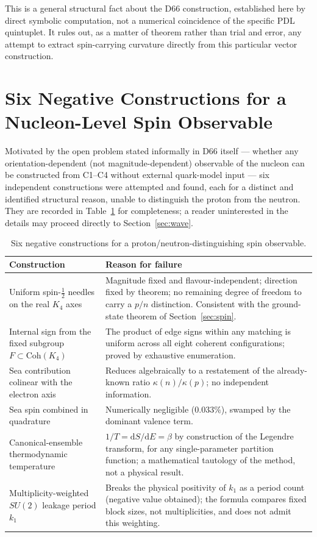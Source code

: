 \documentclass[11pt,a4paper]{article}
\newcommand{\Kfour}{K_4}
\newcommand{\kap}{\kappa}
\begin{document}
This is a general structural fact about the D66 construction, established here by direct symbolic computation, not a numerical coincidence of the specific PDL quintuplet. It rules out, as a matter of theorem rather than trial and error, any attempt to extract spin-carrying curvature directly from this particular vector construction.

\section{Six Negative Constructions for a Nucleon-Level Spin Observable}
\label{sec:negative}

Motivated by the open problem stated informally in D66 itself --- whether any orientation-dependent (not magnitude-dependent) observable of the nucleon can be constructed from C1--C4 without external quark-model input --- six independent constructions were attempted and found, each for a distinct and identified structural reason, unable to distinguish the proton from the neutron. They are recorded in Table~\ref{tab:negative} for completeness; a reader uninterested in the details may proceed directly to Section~\ref{sec:wave}.

\begin{table}[h]
\centering
\small
\caption{Six negative constructions for a proton/neutron-distinguishing spin observable.}
\label{tab:negative}
\begin{tabular}{p{4.3cm}p{8.7cm}}
\toprule
Construction & Reason for failure \\
\midrule
Uniform spin-$\tfrac12$ needles on the real $\Kfour$ axes & Magnitude fixed and flavour-independent; direction fixed by theorem; no remaining degree of freedom to carry a $p/n$ distinction. Consistent with the ground-state theorem of Section~\ref{sec:spin}. \\
Internal sign from the fixed subgroup $F\subset\mathrm{Coh}(\Kfour)$ & The product of edge signs within any matching is uniform across all eight coherent configurations; proved by exhaustive enumeration. \\
Sea contribution colinear with the electron axis & Reduces algebraically to a restatement of the already-known ratio $\kap(n)/\kap(p)$; no independent information. \\
Sea spin combined in quadrature & Numerically negligible ($0.033\%$), swamped by the dominant valence term. \\
Canonical-ensemble thermodynamic temperature & $1/T=\mathrm{d}S/\mathrm{d}E=\beta$ by construction of the Legendre transform, for any single-parameter partition function; a mathematical tautology of the method, not a physical result. \\
Multiplicity-weighted $SU(2)$ leakage period $k_1$ & Breaks the physical positivity of $k_1$ as a period count (negative value obtained); the formula compares fixed block sizes, not multiplicities, and does not admit this weighting. \\
\bottomrule
\end{tabular}
\end{table}
\end{document}
